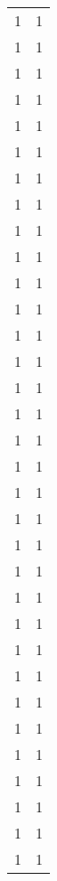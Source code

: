 \begin{tabular}{rr}
                  1 &             1 \\
                  1 &             1 \\
                  1 &             1 \\
                  1 &             1 \\
                  1 &             1 \\
                  1 &             1 \\
                  1 &             1 \\
                  1 &             1 \\
                  1 &             1 \\
                  1 &             1 \\
                  1 &             1 \\
                  1 &             1 \\
                  1 &             1 \\
                  1 &             1 \\
                  1 &             1 \\
                  1 &             1 \\
                  1 &             1 \\
                  1 &             1 \\
                  1 &             1 \\
                  1 &             1 \\
                  1 &             1 \\
                  1 &             1 \\
                  1 &             1 \\
                  1 &             1 \\
                  1 &             1 \\
                  1 &             1 \\
                  1 &             1 \\
                  1 &             1 \\
                  1 &             1 \\
                  1 &             1 \\
                  1 &             1 \\
                  1 &             1 \\
                  1 &             1 \\

\end{tabular}
